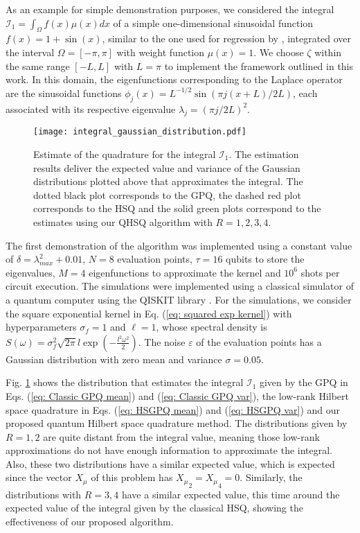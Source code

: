 \documentclass[10pt]{article}
\begin{document}
	As an example for simple demonstration purposes, we considered the integral $\mathcal{I}_1 = \int_\Omega f(x)\mu(x)dx$ of a simple one-dimensional sinusoidal function $f(x) = 1+\sin(x)$, similar to the one used for regression by \citet{Farooq2024QAHSGPR}, integrated over the interval $\Omega = [-\pi, \pi]$ with weight function $\mu(x) = 1$. 
	We choose $\zeta$ within the same range $[-L, L]$ with $L = \pi$ to implement the framework outlined in this work. 
	In this domain, the eigenfunctions corresponding to the Laplace operator are the sinusoidal functions $\phi_j(x) = L^{-1/2}\sin(\pi j(x+L)/2L)$, each associated with its respective eigenvalue $\lambda_{j} = (\pi j/2L)^2$. 
	
	\begin{figure}[tb!]
		\centering
		\texttt{[image: integral\_gaussian\_distribution.pdf]}
		\caption{Estimate of the quadrature for the integral $\mathcal{I}_1$. The estimation results deliver the expected value and variance of the Gaussian distributions plotted above that approximates the integral. The dotted black plot corresponds to the GPQ, the dashed red plot corresponds to the HSQ and the solid green plots correspond to the estimates using our QHSQ algorithm with $R = 1,2,3,4$.}
		\label{fig: Quadrature}
	\end{figure}
	The first demonstration of the algorithm was implemented using a constant value of $\delta = \lambda_{max}^2 + 0.01$, $N = 8$ evaluation points, $\tau = 16$ qubits to store the eigenvalues, $M=4$ eigenfunctions to approximate the kernel and $10^6$ shots per circuit execution. The simulations were implemented using a classical simulator of a quantum computer using the QISKIT library \citep{Qiskit}. For the simulations, we consider the square exponential kernel in Eq. (\ref{eq: squared exp kernel}) with hyperparameters $\sigma_f = 1$ and $\ell = 1$, whose spectral density is $S(\omega)=\sigma_f^2 \sqrt{2 \pi} l \exp \left(-\frac{l^2 \omega^2}{2}\right)$. The noise $\varepsilon$ of the evaluation points has a Gaussian distribution with zero mean and variance $\sigma = 0.05$. 
	
	Fig. \ref{fig: Quadrature} shows the distribution that estimates the integral $\mathcal{I}_1$ given by the GPQ in Eqs. (\ref{eq: Classic GPQ mean}) and (\ref{eq: Classic GPQ var}), the low-rank Hilbert space quadrature in Eqs. (\ref{eq: HSGPQ mean}) and (\ref{eq: HSGPQ var}) and our proposed quantum Hilbert space quadrature method.
	The distributions given by $R = 1,2$ are quite distant from the integral value, meaning those low-rank approximations do not have enough information to approximate the integral. Also, these two distributions have a similar expected value, which is expected since the vector $X_\mu$ of this problem has ${X_{\mu}}_2 ={X_{\mu}}_4 = 0$. Similarly, the distributions with $R = 3,4$ have a similar expected value, this time around the expected value of the integral given by the classical HSQ, showing the effectiveness of our proposed algorithm. 
	
\end{document}
